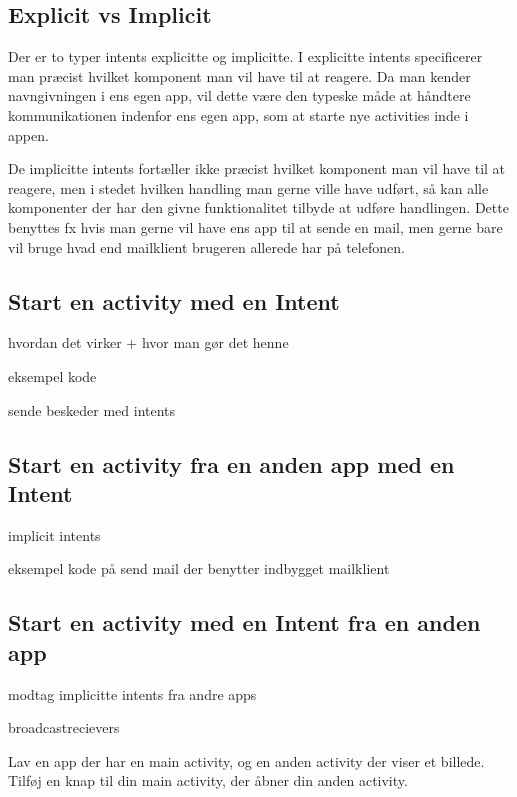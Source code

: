 \subsection{Explicit vs Implicit}

Der er to typer intents explicitte og implicitte. I explicitte intents specificerer man præcist hvilket komponent man vil have til at reagere. Da man kender navngivningen i ens egen app, vil dette være den typeske måde at håndtere kommunikationen indenfor ens egen app, som at starte nye activities inde i appen.

De implicitte intents fortæller ikke præcist hvilket komponent man vil have til at reagere, men i stedet hvilken handling man gerne ville have udført, så kan alle komponenter der har den givne funktionalitet tilbyde at udføre handlingen. Dette benyttes fx hvis man gerne vil have ens app til at sende en mail, men gerne bare vil bruge hvad end mailklient brugeren allerede har på telefonen.

\subsection{Start en activity med en Intent}

hvordan det virker + hvor man gør det henne

eksempel kode

sende beskeder med intents

\subsection{Start en activity fra en anden app med en Intent}

implicit intents

eksempel kode på send mail der benytter indbygget mailklient

\subsection{Start en activity med en Intent fra en anden app}

modtag implicitte intents fra andre apps

broadcastrecievers


\begin{exercise}
	Lav en app der har en main activity, og en anden activity der viser et billede. Tilføj en knap til din main activity, der åbner din anden activity.
\end{exercise}

